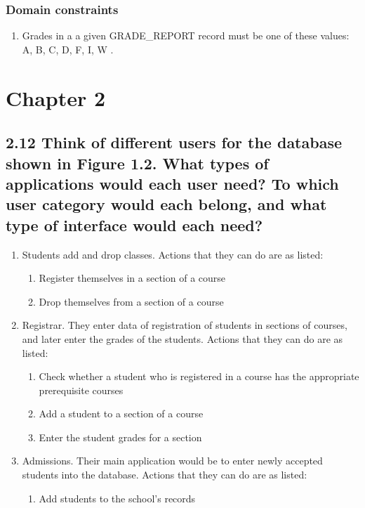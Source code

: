 \documentclass[11pt, oneside]{article}   	%
\begin{document}
\subsubsection*{Domain constraints}
\begin{enumerate}
\item Grades in a a given GRADE\_REPORT record must be one of these values: {A, B, C, D, F, I, W} .
\end{enumerate}

\section*{Chapter 2}
\subsection*{2.12 Think of different users for the database shown in Figure 1.2. What types of applications would each user need? To which user category would each belong, and what type of interface would each need?}

\begin{enumerate}
  \item Students add and drop classes. Actions that they can do are as listed:
    \begin{enumerate}
       \item Register themselves in a section of a course
       \item Drop themselves from a section of a course 
    \end{enumerate}
  \item Registrar. They enter data of registration of students in sections of courses, and later enter the grades of the students. Actions that they can do are as listed:
    \begin{enumerate}
        \item Check whether a student who is registered in a course has the appropriate prerequisite courses
       \item Add a student to a section of a course
       \item Enter the student grades for a section
    \end{enumerate}
  \item Admissions. Their main application would be to enter newly accepted students into the database. Actions that they can do are as listed:
    \begin{enumerate}
    	\item Add students to the school's records
    \end{enumerate}
\end{enumerate}
\end{document}
